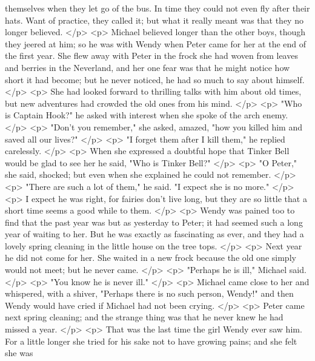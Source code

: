       themselves when they let go of the bus. In time they could not even fly
      after their hats. Want of practice, they called it; but what it really
      meant was that they no longer believed.
    </p>
    <p>
      Michael believed longer than the other boys, though they jeered at him; so
      he was with Wendy when Peter came for her at the end of the first year.
      She flew away with Peter in the frock she had woven from leaves and
      berries in the Neverland, and her one fear was that he might notice how
      short it had become; but he never noticed, he had so much to say about
      himself.
    </p>
    <p>
      She had looked forward to thrilling talks with him about old times, but
      new adventures had crowded the old ones from his mind.
    </p>
    <p>
      "Who is Captain Hook?" he asked with interest when she spoke of the arch
      enemy.
    </p>
    <p>
      "Don't you remember," she asked, amazed, "how you killed him and saved all
      our lives?"
    </p>
    <p>
      "I forget them after I kill them," he replied carelessly.
    </p>
    <p>
      When she expressed a doubtful hope that Tinker Bell would be glad to see
      her he said, "Who is Tinker Bell?"
    </p>
    <p>
      "O Peter," she said, shocked; but even when she explained he could not
      remember.
    </p>
    <p>
      "There are such a lot of them," he said. "I expect she is no more."
    </p>
    <p>
      I expect he was right, for fairies don't live long, but they are so little
      that a short time seems a good while to them.
    </p>
    <p>
      Wendy was pained too to find that the past year was but as yesterday to
      Peter; it had seemed such a long year of waiting to her. But he was
      exactly as fascinating as ever, and they had a lovely spring cleaning in
      the little house on the tree tops.
    </p>
    <p>
      Next year he did not come for her. She waited in a new frock because the
      old one simply would not meet; but he never came.
    </p>
    <p>
      "Perhaps he is ill," Michael said.
    </p>
    <p>
      "You know he is never ill."
    </p>
    <p>
      Michael came close to her and whispered, with a shiver, "Perhaps there is
      no such person, Wendy!" and then Wendy would have cried if Michael had not
      been crying.
    </p>
    <p>
      Peter came next spring cleaning; and the strange thing was that he never
      knew he had missed a year.
    </p>
    <p>
      That was the last time the girl Wendy ever saw him. For a little longer
      she tried for his sake not to have growing pains; and she felt she was
